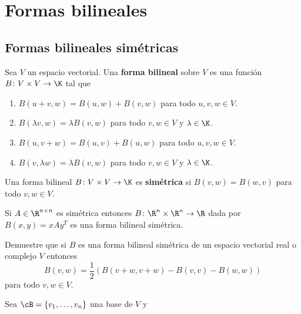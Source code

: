 \chapter{Formas bilineales}

%
%
%

\section{Formas bilineales simétricas}

\begin{block}
    Sea $V$ un espacio vectorial. Una \textbf{forma bilineal} sobre $V$ es una
    función $B\colon V\times V\to\K$ tal que
    \begin{enumerate}
        \item $B(u+v,w)=B(u,w)+B(v,w)$ para todo $u,v,w\in V$.
        \item $B(\lambda v,w)=\lambda B(v,w)$ para todo $v,w\in V$ y $\lambda\in\K$. 
        \item $B(u,v+w)=B(u,v)+B(u,w)$ para todo $u,v,w\in V$.
        \item $B(v,\lambda w)=\lambda B(v,w)$ para todo $v,w\in V$ y $\lambda\in\K$. 
    \end{enumerate}
    Una forma bilineal $B\colon V\times V\to\K$ es \textbf{simétrica} si
    $B(v,w)=B(w,v)$ para todo $v,w\in V$.
\end{block}

\begin{example}
    Si $A\in\R^{n\times n}$ es simétrica entonces $B\colon\R^n\times\R^n\to\R$
    dada por $B(x,y)=xAy^T$ es una forma bilineal simétrica. 
\end{example}

\begin{xca}
    \label{xca:simetrica:diagonal}
    Demuestre que si $B$ es una forma bilineal simétrica de un espacio
    vectorial real o complejo $V$ entonces
    \[
        B(v,w)=\frac12\left(B(v+w,v+w)-B(v,v)-B(w,w)\right)
    \]
    para todo $v,w\in V$. 
\end{xca}

\begin{block}
    Sea $\cB=\{v_1,\dots,v_n\}$ una base de $V$ y 
\end{block}





